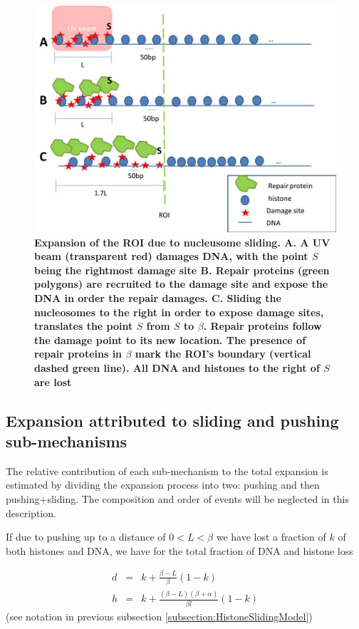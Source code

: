 \documentclass[12pt]{report}
\begin{document}
				   \begin{figure}[H]
				   	\centering
				   	\includegraphics[width=0.7\linewidth]{Images/SlidingModel/histoneSlidingMulti}
				   	\caption{\tiny{\textbf{Expansion of the ROI due to nucleusome sliding. \textbf{A}. A UV beam (transparent red) damages DNA, with the point $S$ being the rightmost damage site \textbf{B}. Repair proteins (green polygons) are recruited to the damage site and expose the DNA in order the repair damages. \textbf{C}. Sliding the nucleosomes to the right in order to expose damage sites, translates the point $S$ from $S$ to $\beta$. Repair proteins follow the damage point to its new location. The presence of repair proteins in $\beta$ mark the ROI's boundary (vertical dashed green line). All DNA and histones to the right of $S$ are lost}}}
				   	\label{fig:histoneSlidingMulti}
				   \end{figure}
		
								
		\subsection{Expansion attributed to sliding and pushing sub-mechanisms}\label{subsection:ExpansionDueToSlidingAndPushing}
		The relative contribution of each sub-mechanism to the total expansion is estimated by dividing the expansion process into two: pushing and then pushing+sliding. The composition and order of events will be neglected in this description. 
		
	    If due to pushing up to a distance of $0<L<\beta$ we have lost a fraction of $k$ of both histones and DNA, we have for the total fraction of DNA and histone loss
         
		\begin{eqnarray*}
			d &=& k+\frac{\beta-L}{\beta}(1-k) \\
			h &=& k+\frac{(\beta-L)(\beta+\alpha)}{\beta l}(1-k)
		\end{eqnarray*}
		(see notation in previous subsection \ref{subsection:HistoneSlidingModel})		
     	
\end{document}
